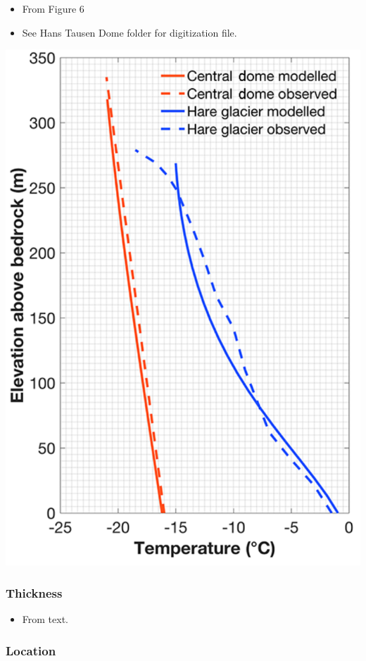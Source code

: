 \documentclass[article,a4paper,times,11pt,twoside]{article}
\begin{document}
\begin{itemize}
\item From \textcite{zekollari_2017} Figure 6
\item See Hans Tausen Dome folder for digitization file.
\end{itemize}
\begin{center}
\includegraphics[width=.9\linewidth]{hanstausen_hare/zekollari_2017_fig6.png}
\end{center}

\subsubsection{Thickness}
\label{sec:org9150472}

\begin{itemize}
\item From \textcite{zekollari_2017} text.
\end{itemize}

\subsubsection{Location}
\label{sec:org32c3fef}
\end{document}
